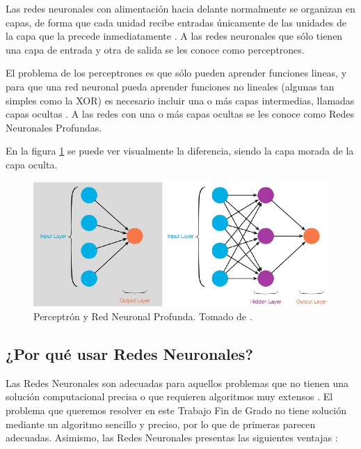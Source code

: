 \documentclass[../main.tex]{subfiles}
\begin{document}
Las redes neuronales con alimentación hacia delante normalmente se organizan en capas, de forma que cada unidad recibe entradas únicamente de las unidades de la capa que la precede inmediatamente \cite{Rusell2004}. A las redes neuronales que sólo tienen una capa de entrada y otra de salida se les conoce como perceptrones. \newline

El problema de los perceptrones es que sólo pueden aprender funciones lineas, y para que una red neuronal pueda aprender funciones no lineales (algunas tan simples como la XOR) es necesario incluir una o más capas intermedias, llamadas capas ocultas \cite{Hilton1986}. A las redes con una o más capas ocultas se les conoce como Redes Neuronales Profundas. \newline

En la figura \ref{fig:perceptron_profunda} se puede ver visualmente la diferencia, siendo la capa morada de la capa oculta.

\begin{figure}[h]
    \centering
    \includegraphics[width=1\textwidth]{imagenes/Red sin oculta vs red con oculta.jpeg}
    \caption[Perceptrón y Red Neuronal Profunda]{Perceptrón y Red Neuronal Profunda. Tomado de \cite{Kang2017}.}
    \label{fig:perceptron_profunda}
\end{figure}

\subsection{¿Por qué usar Redes Neuronales?}

Las Redes Neuronales son adecuadas para aquellos problemas que no tienen una solución computacional precisa o que requieren algoritmos muy extensos \cite{PonceCruz2010}. El problema que queremos resolver en este Trabajo Fin de Grado no tiene solución mediante un algoritmo sencillo y preciso, por lo que de primeras parecen adecuadas. Asimismo, las Redes Neuronales presentas las siguientes ventajas \cite{SerradillaGarcia2016}:
\end{document}

